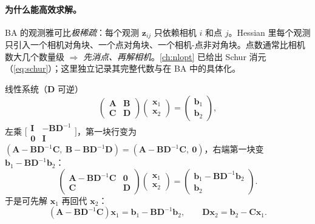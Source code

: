 \paragraph{为什么能高效求解。}BA 的观测雅可比\emph{极稀疏}：每个观测 $\mathbf{z}_{ij}$ 只依赖相机 $i$ 和点 $j$\cite{carlone2026handbook}。Hessian 里每个观测只引入一个相机对角块、一个点对角块、一个相机-点非对角块。点数通常比相机数大几个数量级 $\Rightarrow$ \emph{先消点、再解相机}。\cref{ch:nlopt} 已给出 Schur 消元（\cref{eq:schur}）；这里独立记录其完整代数与在 BA 中的具体化。

\begin{derivation}
\label{thm:vo-schur}
线性系统（$\mathbf{D}$ 可逆）\cite{carlone2026handbook}
\[
  \begin{pmatrix}\mathbf{A}&\mathbf{B}\\\mathbf{C}&\mathbf{D}\end{pmatrix}\begin{pmatrix}\mathbf{x}_1\\\mathbf{x}_2\end{pmatrix}=\begin{pmatrix}\mathbf{b}_1\\\mathbf{b}_2\end{pmatrix},
\]
左乘 $\big[\begin{smallmatrix}\mathbf{I}&-\mathbf{B}\mathbf{D}^{-1}\\\mathbf{0}&\mathbf{I}\end{smallmatrix}\big]$，第一块行变为 $(\mathbf{A}-\mathbf{B}\mathbf{D}^{-1}\mathbf{C},\ \mathbf{B}-\mathbf{B}\mathbf{D}^{-1}\mathbf{D})=(\mathbf{A}-\mathbf{B}\mathbf{D}^{-1}\mathbf{C},\ \mathbf{0})$，右端第一块变 $\mathbf{b}_1-\mathbf{B}\mathbf{D}^{-1}\mathbf{b}_2$：
\[
  \begin{pmatrix}\mathbf{A}-\mathbf{B}\mathbf{D}^{-1}\mathbf{C}&\mathbf{0}\\\mathbf{C}&\mathbf{D}\end{pmatrix}\begin{pmatrix}\mathbf{x}_1\\\mathbf{x}_2\end{pmatrix}=\begin{pmatrix}\mathbf{b}_1-\mathbf{B}\mathbf{D}^{-1}\mathbf{b}_2\\\mathbf{b}_2\end{pmatrix}.
\]
于是可先解 $\mathbf{x}_1$ 再回代 $\mathbf{x}_2$：
\begin{equation}
  (\mathbf{A}-\mathbf{B}\mathbf{D}^{-1}\mathbf{C})\mathbf{x}_1=\mathbf{b}_1-\mathbf{B}\mathbf{D}^{-1}\mathbf{b}_2,\qquad \mathbf{D}\mathbf{x}_2=\mathbf{b}_2-\mathbf{C}\mathbf{x}_1.
  \label{eq:vo-schur-general}
\end{equation}
\end{derivation}


